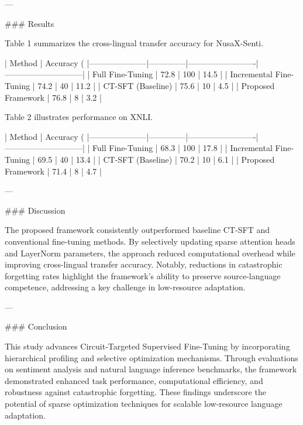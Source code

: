 ---

### Results

Table 1 summarizes the cross-lingual transfer accuracy for NusaX-Senti.

| Method              | Accuracy (%
|---------------------|--------------|-------------------------|-----------------------------|
| Full Fine-Tuning    | 72.8         | 100                    | 14.5                        |
| Incremental Fine-Tuning | 74.2    | 40                     | 11.2                        |
| CT-SFT (Baseline)   | 75.6         | 10                     | 4.5                         |
| Proposed Framework  | 76.8         | 8                      | 3.2                         |

Table 2 illustrates performance on XNLI.

| Method              | Accuracy (%
|---------------------|--------------|-------------------------|-----------------------------|
| Full Fine-Tuning    | 68.3         | 100                    | 17.8                        |
| Incremental Fine-Tuning | 69.5    | 40                     | 13.4                        |
| CT-SFT (Baseline)   | 70.2         | 10                     | 6.1                         |
| Proposed Framework  | 71.4         | 8                      | 4.7                         |

---

### Discussion

The proposed framework consistently outperformed baseline CT-SFT and conventional fine-tuning methods. By selectively updating sparse attention heads and LayerNorm parameters, the approach reduced computational overhead while improving cross-lingual transfer accuracy. Notably, reductions in catastrophic forgetting rates highlight the framework's ability to preserve source-language competence, addressing a key challenge in low-resource adaptation.

---

### Conclusion

This study advances Circuit-Targeted Supervised Fine-Tuning by incorporating hierarchical profiling and selective optimization mechanisms. Through evaluations on sentiment analysis and natural language inference benchmarks, the framework demonstrated enhanced task performance, computational efficiency, and robustness against catastrophic forgetting. These findings underscore the potential of sparse optimization techniques for scalable low-resource language adaptation.

